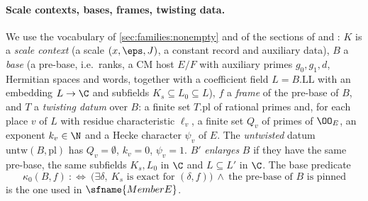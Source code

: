 \paragraph{Scale contexts, bases, frames, twisting data.} We use the vocabulary of
\cref{sec:families:nonempty} and of the sections of
 and
: $K$ is a \emph{scale context}
(a scale $(x,\eps,J)$, a constant record and auxiliary data), $B$ a \emph{base} (a pre-base, i.e.\ ranks,
a CM host $E/F$ with auxiliary primes $g_0,g_1,d$, Hermitian spaces and words, together with a
coefficient field $L=B.\mathrm{LL}$ with an embedding $L\to\C$ and subfields $K_s\subseteq L_0\subseteq L$),
$f$ a \emph{frame} of the pre-base of $B$, and $T$ a \emph{twisting datum} over $B$: a finite set
$T.\mathrm{pl}$ of rational primes and, for each place $v$ of $L$ with residue characteristic
$\ell_v$, a finite set $Q_v$ of primes of $\OO_E$, an exponent $k_v\in\N$ and a Hecke character
$\psi_v$ of $E$. The \emph{untwisted} datum $\mathrm{untw}(B,\mathrm{pl})$ has $Q_v=\emptyset$, $k_v=0$,
$\psi_v=1$. $B'$ \emph{enlarges} $B$ if they have the same pre-base, the same subfields $K_s,L_0$ in $\C$
and $L\subseteq L'$ in $\C$. The base predicate
\[
  \kappa_0(B,f)\ :\Longleftrightarrow\ \bigl(\exists\delta,\ K_s \text{ is exact for } (\delta,f)\bigr)\ \wedge\
  \text{the pre-base of $B$ is pinned}
\]
is the one used in $\sfname{MemberE}$.


